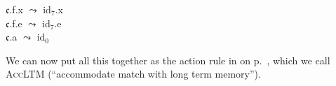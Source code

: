 \begin{ex}
\begin{subex}
\item  $\mathfrak{c}$.f.x $\leadsto$ id$_7$.x\\
       $\mathfrak{c}$.f.e $\leadsto$ id$_7$.e\\
       $\mathfrak{c}$.a $\leadsto$ id$_0$

     \item {} 
 
\end{subex} 
   
\end{ex} 


 
We can now put all this together as the action rule in \nexteg{} on p.~\pageref{ex:AccLTM},
which we call \textsc{AccLTM} (``accommodate match with long term
memory'').  

